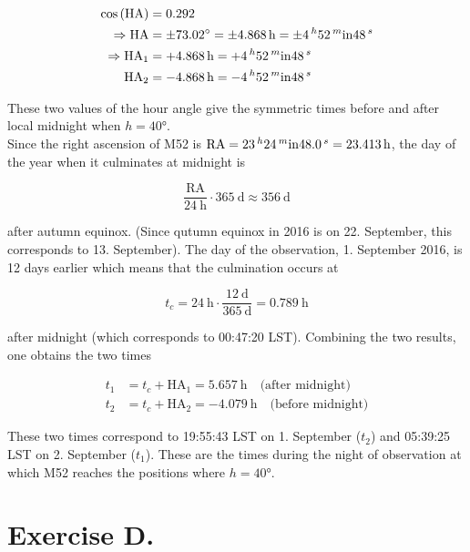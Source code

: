 \documentclass[11pt,a4paper,twoside]{article}
\begin{document}
\begin{align}
 \cos{\left( \text{HA} \right)} &= 0.292 \\
 \Rightarrow \text{HA} &= \pm \ang{73.02} = \pm \SI{4.868}{\hour} = \pm \SI{4}{^\hour} \SI{52}{^\minute} \SI{48}{^\second} \\
 \Rightarrow \text{HA}_1 &= +\SI{4.868}{\hour} = +\SI{4}{^\hour} \SI{52}{^\minute} \SI{48}{^\second} \\
 \text{HA}_2 &= -\SI{4.868}{\hour} = -\SI{4}{^\hour} \SI{52}{^\minute} \SI{48}{^\second} \\
\end{align}

These two values of the hour angle give the symmetric times before and after local midnight when $h=\ang{40}$. \\

Since the right ascension of M52 is $\text{RA} = \SI{23}{^\hour} \SI{24}{^\minute} \SI{48.0}{^\second} = \SI{23.413}{\hour}$, the day of the year when it culminates at midnight is 

\begin{equation}
 \frac{\text{RA}}{\SI{24}{\hour}} \cdot \SI{365}{\day} \approx \SI{356}{\day}
\end{equation}

after autumn equinox. (Since qutumn equinox in 2016 is on 22. September, this corresponds to 13. September). The day of the observation, 1. September 2016, is 12 days earlier which means that the culmination occurs at 

\begin{equation}
 t_c = \SI{24}{\hour} \cdot \frac{\SI{12}{\day}}{\SI{365}{\day}} = \SI{0.789}{\hour}
\end{equation}

after midnight (which corresponds to 00:47:20 LST). Combining the two results, one obtains the two times 

\begin{align}
 t_1 &= t_c + \text{HA}_1 = \SI{5.657}{\hour} \quad \text{(after midnight)} \\
 t_2 &= t_c + \text{HA}_2 = \SI{-4.079}{\hour} \quad \text{(before midnight)}
\end{align}

These two times correspond to 19:55:43 LST on 1. September ($t_2$) and 05:39:25 LST on 2. September ($t_1$). These are the times during the night of observation at which M52 reaches the positions where $h=\ang{40}$. 

\section*{Exercise D.}
\end{document}
